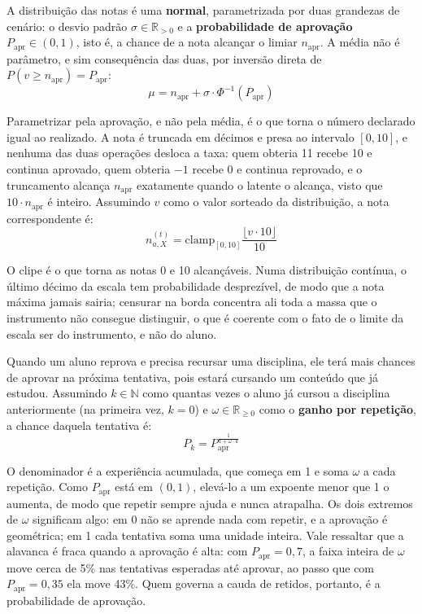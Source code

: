 \documentclass[
    12pt,
    openany,
    oneside,
    a4paper,
    english,
    brazil
]{abntex2}
\begin{document}
A distribuição das notas é uma \textbf{normal}, parametrizada por duas grandezas de cenário: o desvio padrão $\sigma \in \mathbb{R}_{>0}$ e a \textbf{probabilidade de aprovação} $P_\text{apr} \in (0, 1)$, isto é, a chance de a nota alcançar o limiar $n_\text{apr}$. A média não é parâmetro, e sim consequência das duas, por inversão direta de $P(v \geq n_\text{apr}) = P_\text{apr}$:
\begin{equation} \label{eq:media-nota}
    \mu = n_\text{apr} + \sigma \cdot \Phi^{-1}(P_\text{apr})
\end{equation}

Parametrizar pela aprovação, e não pela média, é o que torna o número declarado igual ao realizado. A nota é truncada em décimos e presa ao intervalo $[0, 10]$, e nenhuma das duas operações desloca a taxa: quem obteria 11 recebe 10 e continua aprovado, quem obteria $-1$ recebe 0 e continua reprovado, e o truncamento alcança $n_\text{apr}$ exatamente quando o latente o alcança, visto que $10 \cdot n_\text{apr}$ é inteiro. Assumindo $v$ como o valor sorteado da distribuição, a nota correspondente é:
\begin{equation}
    n_{a, X}^{(t)} = \mathrm{clamp}_{[0, 10]}\frac{\lfloor v \cdot 10 \rfloor}{10}
\end{equation}

O clipe é o que torna as notas 0 e 10 alcançáveis. Numa distribuição contínua, o último décimo da escala tem probabilidade desprezível, de modo que a nota máxima jamais sairia; censurar na borda concentra ali toda a massa que o instrumento não consegue distinguir, o que é coerente com o fato de o limite da escala ser do instrumento, e não do aluno.

Quando um aluno reprova e precisa recursar uma disciplina, ele terá mais chances de aprovar na próxima tentativa, pois estará cursando um conteúdo que já estudou. Assumindo $k \in \mathbb{N}$ como quantas vezes o aluno já cursou a disciplina anteriormente (na primeira vez, $k = 0$) e $\omega \in \mathbb{R}_{\geq 0}$ como o \textbf{ganho por repetição}, a chance daquela tentativa é:
\begin{equation} \label{eq:aprovacao-tentativa}
    P_k = P_\text{apr}^{\frac{1}{1 + \omega \cdot k}}
\end{equation}

O denominador é a experiência acumulada, que começa em 1 e soma $\omega$ a cada repetição. Como $P_\text{apr}$ está em $(0, 1)$, elevá-lo a um expoente menor que 1 o aumenta, de modo que repetir sempre ajuda e nunca atrapalha. Os dois extremos de $\omega$ significam algo: em 0 não se aprende nada com repetir, e a aprovação é geométrica; em 1 cada tentativa soma uma unidade inteira. Vale ressaltar que a alavanca é fraca quando a aprovação é alta: com $P_\text{apr} = 0{,}7$, a faixa inteira de $\omega$ move cerca de 5\% nas tentativas esperadas até aprovar, ao passo que com $P_\text{apr} = 0{,}35$ ela move 43\%. Quem governa a cauda de retidos, portanto, é a probabilidade de aprovação.
\end{document}
